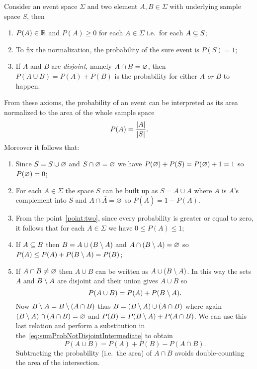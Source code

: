 \documentclass[
	10pt,
	draft
]{scrreprt}
\begin{document}
Consider an event space $\Sigma$ and two element $A,B\in\Sigma$ with underlying sample space $S$, then
\begin{enumerate}
	\item
$P(A) \in \mathbb{R}$ and $P(A) \ge 0$ for each $A\in\Sigma$ i.e.~for each $A\subseteq S$;
	\item
To fix the normalization, the probability of the sure event is $P(S) = 1$;
	\item
If $A$ and $B$ are \emph{disjoint}, namely $A\cap B = \varnothing$, then $P(A\cup B) = P(A) + P(B)$ is the probability for either $A$ \emph{or} $B$ to happen.
\end{enumerate}
From these axioms, the probability of an event can be interpreted as its area normalized to the area of the whole sample space
\begin{equation}\label{eq:interpretationProbabilityArea}
P(A) = \frac{\lvert A\rvert}{\lvert S\rvert}.
\end{equation}
Moreover it follows that:
\begin{enumerate}
	\item
Since $S = S\cup\varnothing$ and $S\cap\varnothing = \varnothing$ we have $P(\varnothing) + P(S) = P(\varnothing)  +1 = 1$ so $P(\varnothing) = 0$; 
	\item\label{point:two}
For each $A\in\Sigma$ the space $S$ can be built up as $S = A \cup \bar{A}$ where $\bar{A}$ is $A$'s complement into $S$ and $ A \cap \bar{A} = \varnothing$ so $P(\bar{A}) = 1 - P(A)$.
	\item
From the point~\ref{point:two}, since every probability is greater or equal to zero, it follows that for each $A\in\Sigma$ we have $0\le P(A) \le 1$;
	\item
If $A \subseteq B$ then $B = A\cup (B\setminus A)$ and $A\cap (B\setminus A)=\varnothing$ so $P(A)\le P(A) + P(B\setminus A) = P(B)$;
	\item
If $A\cap B \neq \varnothing$ then $A\cup B$ can be written as $A \cup(B\setminus A)$.
In this way the sets $A$ and $B\setminus A$ are disjoint and their union gives $A\cup B$ so
\begin{equation}\label{eq:sumProbNotDisjointIntermediate}
P(A\cup B) = P(A) + P(B\setminus A).
\end{equation}
Now $B\setminus A = B \setminus(A\cap B)$ thus $B = (B\setminus A) \cup (A\cap B)$ where again $(B\setminus A) \cap (A\cap B) = \varnothing$ and 
$P(B) = P(B\setminus A) + P(A\cap B)$.
We can use this last relation and perform a substitution in the~\eqref{eq:sumProbNotDisjointIntermediate} to obtain
\begin{equation}
P(A\cup B) = P(A) + P(B) - P(A\cap B).
\end{equation}
Subtracting the probability (i.e.~the area) of $A\cap B$ avoids double-counting the area of the intersection.
\end{enumerate}
\end{document}

